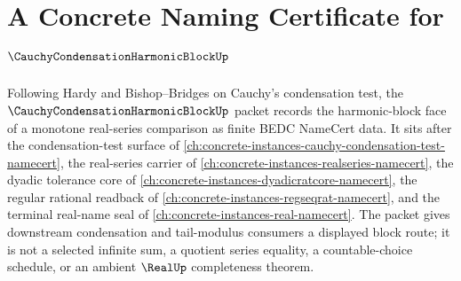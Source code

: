 \chapter{A Concrete Naming Certificate for $\CauchyCondensationHarmonicBlockUp$}
\label{ch:concrete-instances-cauchy-condensation-harmonic-block-namecert}

Following Hardy and Bishop--Bridges on Cauchy's condensation test, the $\CauchyCondensationHarmonicBlockUp$ packet records the harmonic-block face of a monotone real-series comparison as finite BEDC NameCert data. It sits after the condensation-test surface of \autoref{ch:concrete-instances-cauchy-condensation-test-namecert}, the real-series carrier of \autoref{ch:concrete-instances-realseries-namecert}, the dyadic tolerance core of \autoref{ch:concrete-instances-dyadicratcore-namecert}, the regular rational readback of \autoref{ch:concrete-instances-regseqrat-namecert}, and the terminal real-name seal of \autoref{ch:concrete-instances-real-namecert}. The packet gives downstream condensation and tail-modulus consumers a displayed block route; it is not a selected infinite sum, a quotient series equality, a countable-choice schedule, or an ambient $\RealUp$ completeness theorem.

